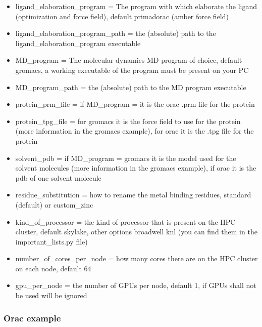 \begin{itemize}
				\item ligand\_elaboration\_program = The program with which elaborate the ligand (optimization and force field), default primadorac (amber force field)
				
				\item ligand\_elaboration\_program\_path = the (absolute) path to the ligand\_elaboration\_program executable

				
				\item MD\_program = The molecular dynamics MD program of choice, default gromacs, a working executable of the program must be present on your PC
				
				\item MD\_program\_path = the (absolute) path to the MD program executable
				
				\item protein\_prm\_file = if MD\_program = it is the orac .prm file for the protein
				
				\item protein\_tpg\_file = for gromacs it is the force field to use for the protein (more information in the gromacs example), for orac it is the .tpg file for the protein
				
				\item solvent\_pdb = if MD\_program = gromacs it is the model used for the solvent molecules (more information in the gromacs example), if orac it is the pdb of one solvent molecule

				\item residue\_substitution = how to rename the metal binding residues, standard (default) or custom\_zinc\cite{zinc_substitutions}
				
				\item kind\_of\_processor = the kind of processor that is present on the HPC cluster, default skylake, other options broadwell knl (you can find them in the important\_lists.py file)
				
				\item number\_of\_cores\_per\_node = how many cores there are on the HPC cluster on each node, default 64

				\item gpu\_per\_node = the number of GPUs per node, default 1, if GPUs shall not be used will be ignored
				
			\end{itemize}
	
				\subsubsection*{Orac example}
				
